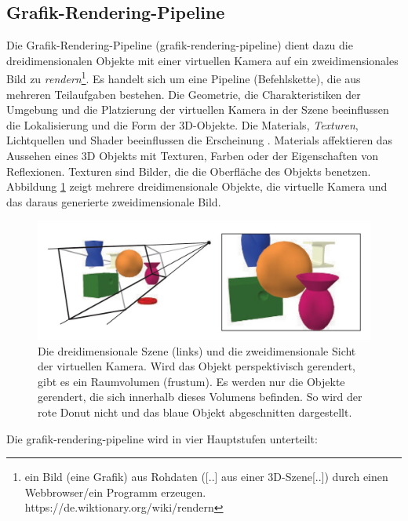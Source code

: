 \subsection{Grafik-Rendering-Pipeline}
\label{grp-rendering-pipeline}
Die Grafik-Rendering-Pipeline (\acrshort{grafik-rendering-pipeline}) dient dazu die dreidimensionalen Objekte mit einer virtuellen Kamera auf ein zweidimensionales Bild zu \textit{rendern}\footnote{\glqq ein Bild (eine Grafik) aus Rohdaten ([..] aus einer 3D-Szene[..]) durch einen Webbrowser/ein Programm erzeugen.\grqq{} https://de.wiktionary.org/wiki/rendern}.
Es handelt sich um eine Pipeline (Befehlskette), die aus mehreren Teilaufgaben bestehen. Die Geometrie, die Charakteristiken der Umgebung und die Platzierung der virtuellen Kamera in der Szene beeinflussen die Lokalisierung und die Form der 3D-Objekte. Die \acrshort{Materials}, \textit{Texturen}, Lichtquellen und Shader beeinflussen die Erscheinung \cite*[Moeller (2019)]{moeller2019}. Materials affektieren das Aussehen eines 3D Objekts mit Texturen, Farben oder der Eigenschaften von Reflexionen. Texturen sind Bilder, die die Oberfläche des Objekts benetzen. Abbildung \ref*{fig:renderpipeline1} zeigt mehrere dreidimensionale Objekte, die virtuelle Kamera und das daraus generierte zweidimensionale Bild. 

\begin{figure}[H]
    \centering
    \includegraphics[width=\textwidth]{img/Render/render_pipeline_1.jpg}
    \caption{Die dreidimensionale Szene (links) und die zweidimensionale Sicht der virtuellen Kamera. Wird das Objekt perspektivisch gerendert, gibt es ein Raumvolumen (frustum). Es werden nur die Objekte gerendert, die sich innerhalb dieses Volumens befinden. So wird der rote Donut nicht und das blaue Objekt abgeschnitten dargestellt\cite*[Moeller (2019)]{moeller2019}.}
    \label{fig:renderpipeline1}
\end{figure}

Die \acrshort{grafik-rendering-pipeline} wird in vier Hauptstufen unterteilt: 

